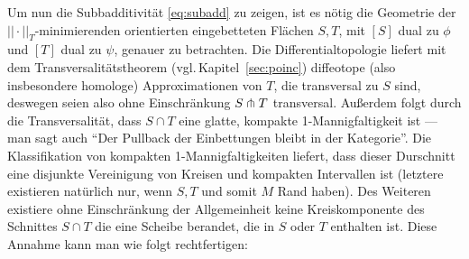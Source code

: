             Um nun die Subbadditivität \eqref{eq:subadd} zu zeigen, ist es nötig die Geometrie der $||\cdot||_T$-minimierenden orientierten eingebetteten Flächen $S,T$, mit $[S]$ dual zu $\phi$ und $[T]$ dual zu $\psi$, genauer zu betrachten. Die Differentialtopologie liefert mit dem Transversalitätstheorem (vgl.\,Kapitel~\ref{sec:poinc}) diffeotope (also insbesondere homologe) Approximationen von $T$, die transversal zu $S$ sind, deswegen seien also ohne Einschränkung $S \pitchfork T$ transversal. Außerdem folgt durch die Transversalität, dass $S\cap T$ eine glatte, kompakte 1-Mannigfaltigkeit ist --- man sagt auch "`Der Pullback der Einbettungen bleibt in der Kategorie"'. Die Klassifikation von kompakten 1-Mannigfaltigkeiten liefert, dass dieser Durschnitt eine disjunkte Vereinigung von Kreisen und kompakten Intervallen ist (letztere existieren natürlich nur, wenn $S,T$ und somit $M$ Rand haben). Des Weiteren existiere ohne Einschränkung der Allgemeinheit keine Kreiskomponente des Schnittes $S\cap T$ die eine Scheibe berandet, die in $S$ oder $T$ enthalten ist. Diese Annahme kann man wie folgt rechtfertigen:

